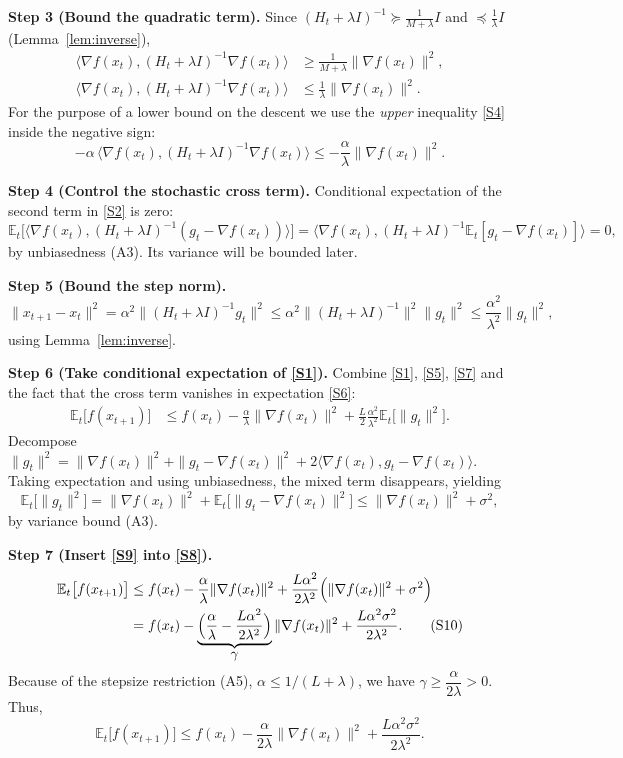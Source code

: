 \documentclass{article}
\newcommand{\EE}{\mathbb{E}}
\newcommand{\ip}[2]{\langle #1,#2\rangle}
\begin{document}
\noindent\textbf{Step 3 (Bound the quadratic term).}
Since $(H_t+\lambda I)^{-1}\succeq\frac{1}{M+\lambda}I$ and
$\preceq\frac{1}{\lambda}I$ (Lemma~\ref{lem:inverse}),
\begin{align}
\ip{\nabla f(x_t)}{(H_t+\lambda I)^{-1}\nabla f(x_t)}
&\ge \frac{1}{M+\lambda}\|\nabla f(x_t)\|^{2}, \tag{S3}\\
\ip{\nabla f(x_t)}{(H_t+\lambda I)^{-1}\nabla f(x_t)}
&\le \frac{1}{\lambda}\|\nabla f(x_t)\|^{2}. \tag{S4}
\end{align}
For the purpose of a lower bound on the descent we use the
\emph{upper} inequality \eqref{S4} inside the negative sign:
\[
-\alpha\,\ip{\nabla f(x_t)}{(H_t+\lambda I)^{-1}\nabla f(x_t)}
\le -\frac{\alpha}{\lambda}\|\nabla f(x_t)\|^{2}.
\tag{S5}
\]

\noindent\textbf{Step 4 (Control the stochastic cross term).}
Conditional expectation of the second term in \eqref{S2} is zero:
\[
\EE_t\bigl[\ip{\nabla f(x_t)}{(H_t+\lambda I)^{-1}(g_t-\nabla f(x_t))}\bigr]
= \ip{\nabla f(x_t)}{(H_t+\lambda I)^{-1}\EE_t[g_t-\nabla f(x_t)]}=0,
\tag{S6}
\]
by unbiasedness (A3).  Its variance will be bounded later.

\noindent\textbf{Step 5 (Bound the step norm).}
\[
\|x_{t+1}-x_t\|^{2}
= \alpha^{2}\|(H_t+\lambda I)^{-1}g_t\|^{2}
\le \alpha^{2}\|(H_t+\lambda I)^{-1}\|^{2}\|g_t\|^{2}
\le \frac{\alpha^{2}}{\lambda^{2}}\|g_t\|^{2},
\tag{S7}
\]
using Lemma~\ref{lem:inverse}.

\noindent\textbf{Step 6 (Take conditional expectation of \eqref{S1}).}
Combine \eqref{S1}, \eqref{S5}, \eqref{S7} and the fact that the cross
term vanishes in expectation \eqref{S6}:
\begin{align}
\EE_t\bigl[f(x_{t+1})\bigr]
&\le f(x_t) -\frac{\alpha}{\lambda}\|\nabla f(x_t)\|^{2}
    +\frac{L}{2}\frac{\alpha^{2}}{\lambda^{2}}\EE_t\!\bigl[\|g_t\|^{2}\bigr].
\tag{S8}
\end{align}
Decompose $\|g_t\|^{2}
= \|\nabla f(x_t)\|^{2}+\|g_t-\nabla f(x_t)\|^{2}
+2\ip{\nabla f(x_t)}{g_t-\nabla f(x_t)}$.
Taking expectation and using unbiasedness, the mixed term disappears,
yielding
\[
\EE_t\!\bigl[\|g_t\|^{2}\bigr]
= \|\nabla f(x_t)\|^{2}+\EE_t\!\bigl[\|g_t-\nabla f(x_t)\|^{2}\bigr]
\le \|\nabla f(x_t)\|^{2}+\sigma^{2},
\tag{S9}
\]
by variance bound (A3).

\noindent\textbf{Step 7 (Insert \eqref{S9} into \eqref{S8}).}
\begin{align}
\EE_t\bigl[f(x_{t+1})\bigr]
&\le f(x_t) -\frac{\alpha}{\lambda}\|\nabla f(x_t)\|^{2}
    +\frac{L\alpha^{2}}{2\lambda^{2}}\Bigl(\|\nabla f(x_t)\|^{2}+\sigma^{2}\Bigr) \nonumber\\
&= f(x_t) -\underbrace{\Bigl(\frac{\alpha}{\lambda}
    -\frac{L\alpha^{2}}{2\lambda^{2}}\Bigr)}_{\displaystyle\gamma}
    \|\nabla f(x_t)\|^{2}
    +\frac{L\alpha^{2}\sigma^{2}}{2\lambda^{2}} .
\tag{S10}
\end{align}
Because of the stepsize restriction (A5), $\alpha\le 1/(L+\lambda)$,
we have $\gamma\ge \dfrac{\alpha}{2\lambda}>0$.
Thus,
\[
\EE_t\bigl[f(x_{t+1})\bigr]
\le f(x_t)-\frac{\alpha}{2\lambda}\|\nabla f(x_t)\|^{2}
    +\frac{L\alpha^{2}\sigma^{2}}{2\lambda^{2}} .
\tag{S11}
\]
\end{document}
